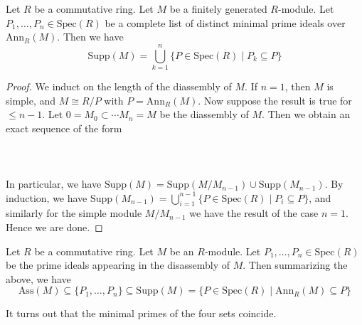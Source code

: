 \documentclass[a4paper]{article}
\begin{document}
\begin{lmm}{}{} Let $R$ be a commutative ring. Let $M$ be a finitely generated $R$-module. Let $P_1,\dots,P_n\in\text{Spec}(R)$ be a complete list of distinct minimal prime ideals over $\text{Ann}_R(M)$. Then we have $$\text{Supp}(M)=\bigcup_{k=1}^n\{P\in\text{Spec}(R)\;|\;P_k\subseteq P\}$$ \tcbline
\begin{proof}
We induct on the length of the diassembly of $M$. If $n=1$, then $M$ is simple, and $M\cong R/P$ with $P=\text{Ann}_R(M)$. Now suppose the result is true for $\leq n-1$. Let $0=M_0\subset\cdots M_n=M$ be the diassembly of $M$. Then we obtain an exact sequence of the form \\~\\
\\~\\
In particular, we have $\text{Supp}(M)=\text{Supp}(M/M_{n-1})\cup\text{Supp}(M_{n-1})$. By induction, we have $\text{Supp}(M_{n-1})=\bigcup_{i=1}^{n-1}\{P\in\text{Spec}(R)\;|\;P_i\subseteq P\}$, and similarly for the simple module $M/M_{n-1}$ we have the result of the case $n=1$. Hence we are done. 
\end{proof}
\end{lmm}

Let $R$ be a commutative ring. Let $M$ be an $R$-module. Let $P_1,\dots,P_n\in\text{Spec}(R)$ be the prime ideals appearing in the disassembly of $M$. Then summarizing the above, we have $$\text{Ass}(M)\subseteq\{P_1,\dots,P_n\}\subseteq\text{Supp}(M)=\{P\in\text{Spec}(R)\;|\;\text{Ann}_R(M)\subseteq P\}$$

It turns out that the minimal primes of the four sets coincide. 
\end{document}

